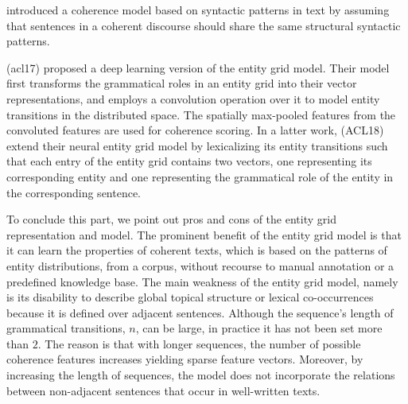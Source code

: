  introduced a coherence model based on syntactic patterns in text by assuming that sentences in a coherent discourse should share the same structural syntactic patterns.



 (acl17) proposed a deep learning version of the entity grid model. 
Their model first transforms the grammatical roles in an entity grid into their vector representations, and employs a convolution operation over it to model entity transitions in the distributed space. 
The spatially max-pooled features from the convoluted features are used for coherence scoring. 
In a latter work,  (ACL18) extend their neural entity grid model by lexicalizing its entity transitions such that each entry of the entity grid contains two vectors, one representing its corresponding entity and one representing the grammatical role of the entity in the corresponding sentence.  



To conclude this part, we point out pros and cons of the entity grid representation and model. 
The prominent benefit of the entity grid model is that it can learn the properties of coherent texts, which is based on the patterns of entity distributions, from a corpus, without recourse to manual annotation or a predefined knowledge base.
The main weakness of the entity grid model, namely is its disability to describe global topical structure or lexical co-occurrences because it is defined over adjacent sentences. 
Although the sequence's length of grammatical transitions, $n$, can be large, in practice it has not been set more than $2$. 
The reason is that with longer sequences, the number of possible coherence features increases yielding sparse feature vectors. 
Moreover, by increasing the length of sequences, the model does not incorporate the relations between non-adjacent sentences that occur in well-written texts. 


